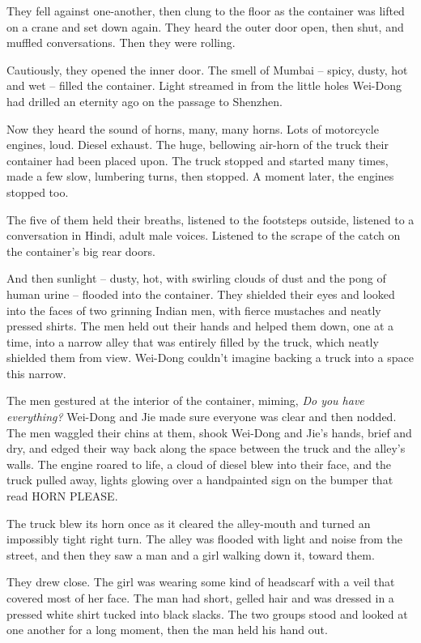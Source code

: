 They fell against one-another, then clung to the floor as the
container was lifted on a crane and set down again. They heard the
outer door open, then shut, and muffled conversations. Then they
were rolling.

Cautiously, they opened the inner door. The smell of Mumbai --
spicy, dusty, hot and wet -- filled the container. Light streamed
in from the little holes Wei-Dong had drilled an eternity ago on
the passage to Shenzhen.

Now they heard the sound of horns, many, many horns. Lots of
motorcycle engines, loud. Diesel exhaust. The huge, bellowing
air-horn of the truck their container had been placed upon. The
truck stopped and started many times, made a few slow, lumbering
turns, then stopped. A moment later, the engines stopped too.

The five of them held their breaths, listened to the footsteps
outside, listened to a conversation in Hindi, adult male voices.
Listened to the scrape of the catch on the container's big rear
doors.

And then sunlight -- dusty, hot, with swirling clouds of dust and
the pong of human urine -- flooded into the container. They
shielded their eyes and looked into the faces of two grinning
Indian men, with fierce mustaches and neatly pressed shirts. The
men held out their hands and helped them down, one at a time, into
a narrow alley that was entirely filled by the truck, which neatly
shielded them from view. Wei-Dong couldn't imagine backing a truck
into a space this narrow.

The men gestured at the interior of the container, miming,
\emph{Do you have everything?} Wei-Dong and Jie made sure everyone
was clear and then nodded. The men waggled their chins at them,
shook Wei-Dong and Jie's hands, brief and dry, and edged their way
back along the space between the truck and the alley's walls. The
engine roared to life, a cloud of diesel blew into their face, and
the truck pulled away, lights glowing over a handpainted sign on
the bumper that read HORN PLEASE.

The truck blew its horn once as it cleared the alley-mouth and
turned an impossibly tight right turn. The alley was flooded with
light and noise from the street, and then they saw a man and a girl
walking down it, toward them.

They drew close. The girl was wearing some kind of headscarf with a
veil that covered most of her face. The man had short, gelled hair
and was dressed in a pressed white shirt tucked into black slacks.
The two groups stood and looked at one another for a long moment,
then the man held his hand out.

